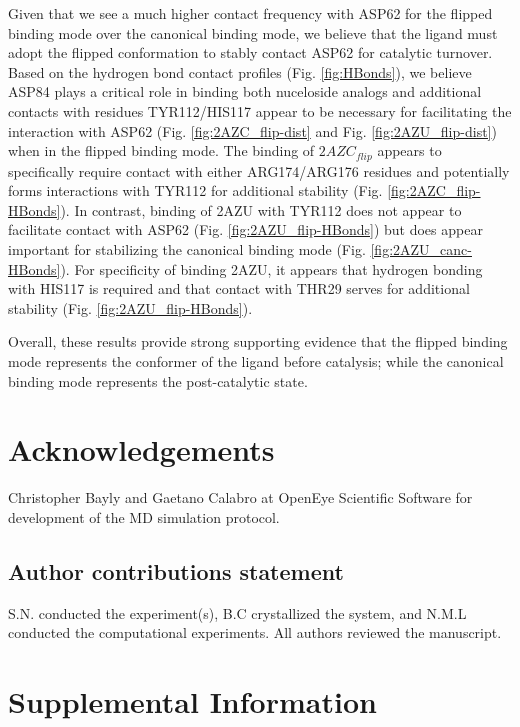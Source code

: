 Given that we see a much higher contact frequency with ASP62 for the flipped binding mode over the canonical binding mode, we believe that the ligand must adopt the flipped conformation to stably contact ASP62 for catalytic turnover.
Based on the hydrogen bond contact profiles (Fig. \ref{fig:HBonds}), we believe ASP84 plays a critical role in binding both nuceloside analogs and additional contacts with residues TYR112/HIS117 appear to be necessary for facilitating the interaction with ASP62 (Fig. \ref{fig:2AZC_flip-dist} and Fig. \ref{fig:2AZU_flip-dist}) when in the flipped binding mode.
The binding of $2AZC_{flip}$ appears to specifically require contact with either ARG174/ARG176 residues and potentially forms interactions with TYR112 for additional stability (Fig. \ref{fig:2AZC_flip-HBonds}).
In contrast, binding of 2AZU with TYR112 does not appear to facilitate contact with ASP62 (Fig. \ref{fig:2AZU_flip-HBonds}) but does appear important for stabilizing the canonical binding mode (Fig. \ref{fig:2AZU_canc-HBonds}).
For specificity of binding 2AZU, it appears that hydrogen bonding with HIS117 is required and that contact with THR29 serves for additional stability (Fig. \ref{fig:2AZU_flip-HBonds}).

Overall, these results provide strong supporting evidence that the flipped binding mode represents the conformer of the ligand before catalysis; while the canonical binding mode represents the post-catalytic state.

\section{Acknowledgements}

Christopher Bayly and Gaetano Calabro at OpenEye Scientific Software for development of the MD simulation protocol.

\subsection{Author contributions statement}

S.N. conducted the experiment(s),  B.C crystallized the system, and N.M.L conducted the computational experiments.  All authors reviewed the manuscript. 

\section{Supplemental Information}

